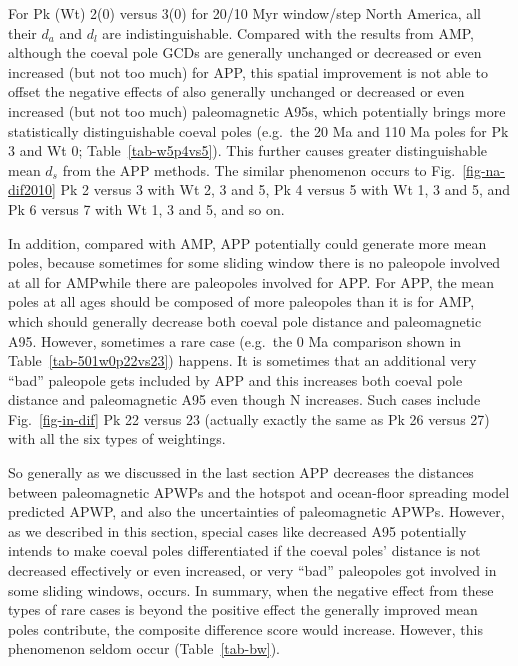 For Pk (Wt) 2(0) versus 3(0) for 20/10 Myr window/step North America, all their $d_a$ and
$d_l$ are indistinguishable. Compared with the results from AMP, although the
coeval pole GCDs are generally unchanged or decreased or even increased (but not
too much) for APP, this spatial improvement is not able to offset the negative
effects of also generally unchanged or decreased or even increased (but not too
much) paleomagnetic A95s, which potentially brings more statistically
distinguishable coeval poles (e.g.\ the 20 Ma and 110 Ma poles for Pk 3 and
Wt 0; Table~\ref{tab-w5p4vs5}). This further causes greater
distinguishable mean $d_s$ from the APP methods. The similar phenomenon occurs
to Fig.~\ref{fig-na-dif2010} Pk 2 versus 3 with Wt 2, 3 and 5, Pk
4 versus 5 with Wt 1, 3 and 5, and Pk 6 versus 7 with Wt 1, 3 and 5, and
so on.

In addition, compared with AMP, APP potentially could generate more mean poles,
because sometimes for some sliding window there is no paleopole involved at all
for AMP\@ while there are paleopoles involved for APP\@. For APP, the
mean poles at all ages should be composed of more paleopoles than it is for
AMP, which should generally decrease both coeval pole distance and paleomagnetic
A95. However, sometimes a rare case (e.g.\ the 0 Ma comparison shown in
Table~\ref{tab-501w0p22vs23}) happens. It is sometimes that an additional
very ``bad'' paleopole gets included by APP and this increases both coeval pole
distance and paleomagnetic A95 even though N increases. Such cases include
Fig.~\ref{fig-in-dif} Pk 22 versus 23 (actually exactly the same as Pk 26
versus 27) with all the six types of weightings.

So generally as we discussed in the last section APP decreases the distances
between paleomagnetic APWPs and the hotspot and ocean-floor spreading model
predicted APWP, and also the uncertainties of paleomagnetic APWPs. However, as
we described in this section, special cases like decreased A95 potentially
intends to make coeval poles differentiated if the coeval poles' distance is
not decreased effectively or even increased, or very ``bad'' paleopoles got
involved in some sliding windows, occurs. In summary, when the negative effect
from these types of rare cases is beyond the positive effect the generally
improved mean poles contribute, the composite difference score would increase.
However, this phenomenon seldom occur (Table~\ref{tab-bw}).

